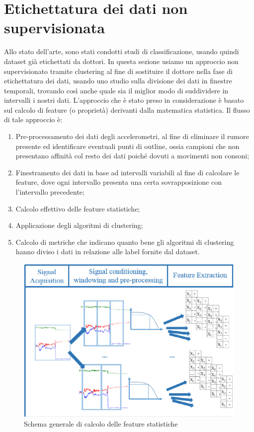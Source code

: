 \section{Etichettatura dei dati non supervisionata}
Allo stato dell'arte, sono stati condotti studi di classificazione, usando quindi dataset già etichettati da dottori. In questa sezione usiamo un approccio non supervisionato tramite clustering al fine di sostituire il dottore nella fase di etichettatura dei dati, usando uno studio sulla divisione dei dati in finestre temporali, trovando così anche quale sia il miglior modo di suddividere in intervalli i nostri dati. L'approccio che è stato preso in considerazione è basato sul calcolo di feature (o proprietà) derivanti dalla matematica statistica. Il flusso di tale approccio è:
\begin{enumerate}
	\item Pre-processamento dei dati degli accelerometri, al fine di eliminare il rumore presente ed identificare eventuali punti di outline, ossia campioni che non presentano affinità col resto dei dati poiché dovuti a movimenti non consoni;
	\item Finestramento dei dati in base ad intervalli variabili al fine di calcolare le feature, dove ogni intervallo presenta una certa sovrapposizione con l'intervallo precedente;
	\item Calcolo effettivo delle feature statistiche;
	\item Applicazione degli algoritmi di clustering;
	\item Calcolo di metriche che indicano quanto bene gli algoritmi di clustering hanno diviso i dati in relazione alle label fornite dal dataset.
\end{enumerate}
\begin{figure}[h!]
	\centering
	\includegraphics[scale=0.6]{images/flusso_feature.png}
	\caption{Schema generale di calcolo delle feature statistiche}
	\label{Flusso Feature}
\end{figure}
